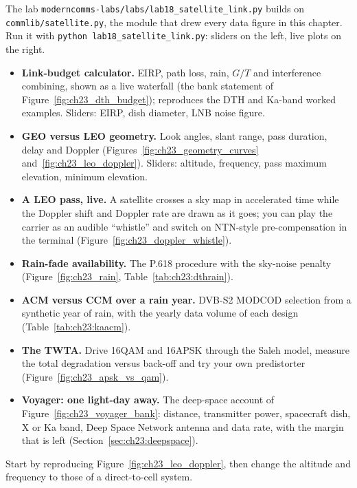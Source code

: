 \begin{labbox}
The lab \texttt{moderncomms-labs/labs/lab18\_satellite\_link.py} builds on
\texttt{commlib/satellite.py}, the module that drew every data figure in this chapter. Run it with
\texttt{python lab18\_satellite\_link.py}: sliders on the left, live plots on the right.
\begin{itemize}
\item \textbf{Link-budget calculator.} EIRP, path loss, rain, $G/T$ and interference combining,
shown as a live waterfall (the bank statement of Figure~\ref{fig:ch23_dth_budget}); reproduces the
DTH and Ka-band worked examples. Sliders: EIRP, dish diameter, LNB noise figure.
\item \textbf{GEO versus LEO geometry.} Look angles, slant range, pass duration, delay and Doppler
(Figures~\ref{fig:ch23_geometry_curves} and~\ref{fig:ch23_leo_doppler}). Sliders: altitude,
frequency, pass maximum elevation, minimum elevation.
\item \textbf{A LEO pass, live.} A satellite crosses a sky map in accelerated time while the
Doppler shift and Doppler rate are drawn as it goes; you can play the carrier as an audible
``whistle'' and switch on NTN-style pre-compensation in the terminal
(Figure~\ref{fig:ch23_doppler_whistle}).
\item \textbf{Rain-fade availability.} The P.618 procedure with the sky-noise penalty
(Figure~\ref{fig:ch23_rain}, Table~\ref{tab:ch23:dthrain}).
\item \textbf{ACM versus CCM over a rain year.} DVB-S2 MODCOD selection from a synthetic year of
rain, with the yearly data volume of each design (Table~\ref{tab:ch23:kaacm}).
\item \textbf{The TWTA.} Drive 16QAM and 16APSK through the Saleh model, measure the total
degradation versus back-off and try your own predistorter (Figure~\ref{fig:ch23_apsk_vs_qam}).
\item \textbf{Voyager: one light-day away.} The deep-space account of
Figure~\ref{fig:ch23_voyager_bank}: distance, transmitter power, spacecraft dish, X or Ka band,
Deep Space Network antenna and data rate, with the margin that is left
(Section~\ref{sec:ch23:deepspace}).
\end{itemize}
Start by reproducing Figure~\ref{fig:ch23_leo_doppler}, then change the altitude and frequency to
those of a direct-to-cell system.
\end{labbox}


